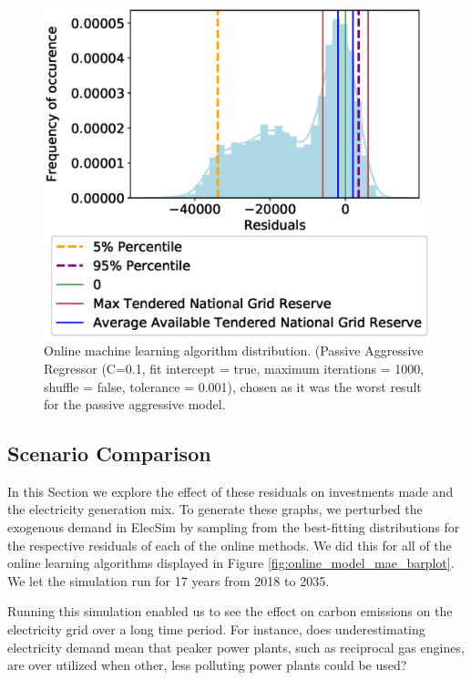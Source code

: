 \documentclass[final,3p,times,twocolumn,numbers]{elsarticle}
\begin{document}
\begin{figure}
\centering
\includegraphics[width=\columnwidth,natwidth=500,natheight=500]{figures/results/online_learning_dists-C-0.1-fit_intercept-true-max_iter-1000-shuffle-false-tol 0.001.eps}
\caption{Online machine learning algorithm distribution. (Passive Aggressive Regressor (C=0.1, fit intercept = true, maximum iterations = 1000, shuffle = false, tolerance = 0.001), chosen as it was the worst result for the passive aggressive model.}
\label{fig:bad_online_learning_day_distribution}
\end{figure}




\subsection{Scenario Comparison}

In this Section we explore the effect of these residuals on investments made and the electricity generation mix.  To generate these graphs, we perturbed the exogenous demand in ElecSim by sampling from the best-fitting distributions for the respective residuals of each of the online methods. We did this for all of the online learning algorithms displayed in Figure \ref{fig:online_model_mae_barplot}. We let the simulation run for 17 years from 2018 to 2035. 

Running this simulation enabled us to see the effect on carbon emissions on the electricity grid over a long time period. For instance, does underestimating electricity demand mean that peaker power plants, such as reciprocal gas engines, are over utilized when other, less polluting power plants could be used?
\end{document}
